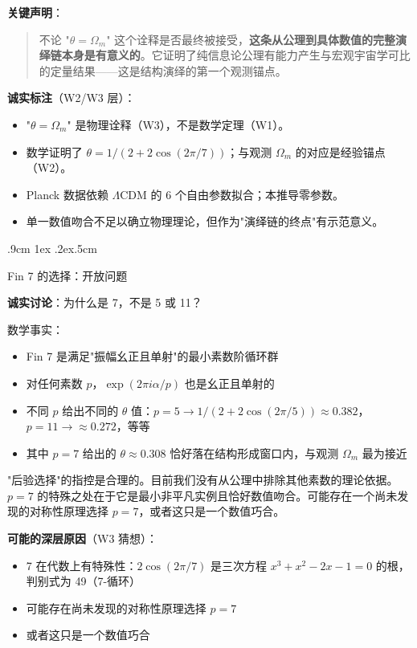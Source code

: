 \documentclass[aps,prd,twocolumn,nofootinbib,floatfix]{revtex4-2}
\makeatletter
\def\subsection{%
  \@startsection{subsection}{2}{\z@}
    {.9cm \@plus1ex \@minus .2ex}{.5cm}
    {\normalfont\large\bfseries\raggedright}%
}
\makeatother
\begin{document}
\textbf{关键声明}：
\begin{quote}
不论 "$\theta = \Omega_m$" 这个诠释是否最终被接受，\textbf{这条从公理到具体数值的完整演绎链本身是有意义的}。它证明了纯信息论公理有能力产生与宏观宇宙学可比的定量结果——这是结构演绎的第一个观测锚点。
\end{quote}

\textbf{诚实标注}（W2/W3 层）：
\begin{itemize}
    \item "$\theta = \Omega_m$" 是物理诠释（W3），不是数学定理（W1）。
    \item 数学证明了 $\theta = 1/(2+2\cos(2\pi/7))$；与观测 $\Omega_m$ 的对应是经验锚点（W2）。
    \item Planck 数据依赖 $\Lambda$CDM 的 6 个自由参数拟合；本推导零参数。
    \item 单一数值吻合不足以确立物理理论，但作为"演绎链的终点"有示范意义。
\end{itemize}

\subsection{Fin 7 的选择：开放问题}

\textbf{诚实讨论}：为什么是 7，不是 5 或 11？

数学事实：
\begin{itemize}
    \item Fin 7 是满足"振幅幺正且单射"的最小素数阶循环群
    \item 对任何素数 $p$，$\exp(2\pi i \alpha/p)$ 也是幺正且单射的
    \item 不同 $p$ 给出不同的 $\theta$ 值：$p=5 \to 1/(2+2\cos(2\pi/5)) \approx 0.382$，$p=11 \to \approx 0.272$，等等
    \item 其中 $p=7$ 给出的 $\theta \approx 0.308$ 恰好落在结构形成窗口内，与观测 $\Omega_m$ 最为接近
\end{itemize}

"后验选择"的指控是合理的。目前我们没有从公理中排除其他素数的理论依据。$p=7$ 的特殊之处在于它是最小非平凡实例且恰好数值吻合。可能存在一个尚未发现的对称性原理选择 $p=7$，或者这只是一个数值巧合。

\textbf{可能的深层原因}（W3 猜想）：
\begin{itemize}
    \item 7 在代数上有特殊性：$2\cos(2\pi/7)$ 是三次方程 $x^3 + x^2 - 2x - 1 = 0$ 的根，判别式为 49（7-循环）
    \item 可能存在尚未发现的对称性原理选择 $p=7$
    \item 或者这只是一个数值巧合
\end{itemize}
\end{document}
